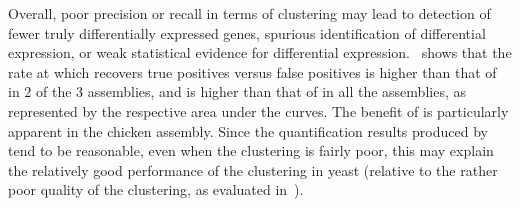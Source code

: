 Overall, poor precision or recall in terms of clustering may lead to detection of fewer truly differentially expressed genes, spurious identification of differential expression, or weak statistical evidence for differential expression.~ shows that the rate at which \rapclust recovers true positives versus false positives is higher than that of \cdhit in $2$ of the $3$ assemblies, and is higher than that of \corset in all the assemblies, as represented by the respective area under the curves. The benefit of \rapclust is particularly apparent in the chicken assembly. Since the quantification results produced by \sailfish tend to be reasonable, even when the clustering is fairly poor, this may explain the relatively good performance of the \cdhit clustering in yeast (relative to the rather poor quality of the clustering, as evaluated in~).

